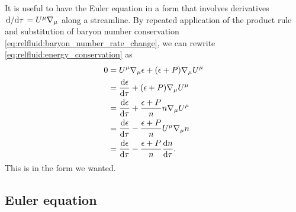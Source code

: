 It is useful to have the Euler equation in a form that involves derivatives $\odv{}/{\tau} = U^\mu \nabla_\mu$ along a streamline.
By repeated application of the product rule and substitution of baryon number conservation \eqref{eq:relfluid:baryon_number_rate_change}, we can rewrite \eqref{eq:relfluid:energy_conservation} as
\begin{equation}
\begin{split}
	0 &= U^\mu \nabla_\mu \epsilon + (\epsilon+P) \nabla_\mu U^\mu  \\
	  &= \odv{\epsilon}{\tau} + (\epsilon+P) \nabla_\mu U^\mu \\
	  &= \odv{\epsilon}{\tau} + \frac{\epsilon+P}{n} n \nabla_\mu U^\mu \\
	  &= \odv{\epsilon}{\tau} - \frac{\epsilon+P}{n} U^\mu \nabla_\mu n \\
	  &= \odv{\epsilon}{\tau} - \frac{\epsilon+P}{n} \odv{n}{\tau} . \\
\end{split}
\label{eq:relfluid:energy_conservation_rewritten}
\end{equation}
This is in the form we wanted.

\subsection{Euler equation}

